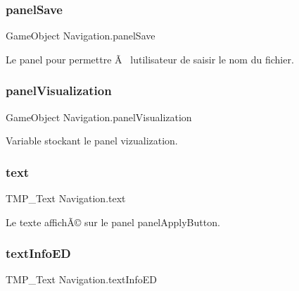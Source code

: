 \subsubsection{\texorpdfstring{panel\+Save}{panelSave}}
{\footnotesize\ttfamily Game\+Object Navigation.\+panel\+Save\hspace{0.3cm}{\ttfamily [private]}}



Le panel pour permettre Ã  l\textquotesingle{}utilisateur de saisir le nom du fichier. 

\mbox{\label{class_navigation_a87c0235e826c5cd805b95b81c8c55ceb}} 
\subsubsection{\texorpdfstring{panel\+Visualization}{panelVisualization}}
{\footnotesize\ttfamily Game\+Object Navigation.\+panel\+Visualization\hspace{0.3cm}{\ttfamily [private]}}



Variable stockant le panel vizualization. 

\mbox{\label{class_navigation_ac6f0605a263e970630f2946dbc8f5ca3}} 
\subsubsection{\texorpdfstring{text}{text}}
{\footnotesize\ttfamily T\+M\+P\+\_\+\+Text Navigation.\+text\hspace{0.3cm}{\ttfamily [private]}}



Le texte affichÃ© sur le panel panel\+Apply\+Button. 

\mbox{\label{class_navigation_af2ad653f49a97486583aa60103af3e6d}} 
\subsubsection{\texorpdfstring{text\+Info\+ED}{textInfoED}}
{\footnotesize\ttfamily T\+M\+P\+\_\+\+Text Navigation.\+text\+Info\+ED\hspace{0.3cm}{\ttfamily [private]}}



